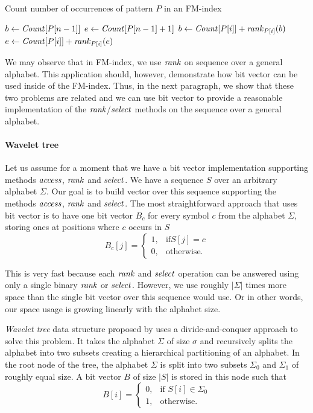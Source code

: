\begin{algorithm}
\caption{Count number of occurrences of pattern $P$ in an FM-index}\label{alg:fm_index_count}
$b \gets \mathit{Count}[P[n-1]]$\;
$e \gets \mathit{Count}[P[n-1]+1]$\;
 {
	$b \gets \mathit{Count}[P[i]] + \mathit{rank}_{P[i]}(b)$\;
	$e \gets \mathit{Count}[P[i]] + \mathit{rank}_{P[i]}(e)$\;
}
\end{algorithm}

We may observe that in FM-index, we use $\mathit{rank}$ on sequence over a general alphabet. This application
should, however, demonstrate how bit vector can be used inside of the FM-index. Thus, in the next
paragraph, we show that these two problems are related and we can use bit vector to provide a
reasonable implementation of the $\mathit{rank}$/$\mathit{select}$ methods on the sequence over a general alphabet.

\paragraph{Wavelet tree}
\label{section:WaweletTree}

Let us assume for a moment that we have a bit vector implementation supporting methods $\mathit{access}$,
$\mathit{rank}$ and $\mathit{select}$. We have a sequence $S$ over an arbitrary alphabet $\Sigma$. Our goal is to
build vector over this sequence supporting the methods $\mathit{access}$, $\mathit{rank}$ and $\mathit{select}$. The most
straightforward approach that uses bit vector is to have one bit vector $B_c$ for every symbol $c$
from the alphabet $\Sigma$, storing ones at positions where $c$ occurs in $S$
\[
    B_c[j]= 
\begin{cases}
	1,& \text{if} S[j]=c \\
    0,& \text{otherwise.}
\end{cases}
\]

This is very fast because each $\mathit{rank}$ and $\mathit{select}$ operation can be answered using only a single
binary $\mathit{rank}$ or $\mathit{select}$. However, we use roughly $|\Sigma|$ times more space than the single bit
vector over this sequence would use. Or in other words, our space usage is growing linearly with the
alphabet size.

\textit{Wavelet tree} data structure proposed by \cite{grossi2003high} uses a divide-and-conquer
approach to solve this problem. It takes the alphabet $\Sigma$ of size $\sigma$ and recursively
splits the alphabet into two subsets creating a hierarchical partitioning of an alphabet. In the
root node of the tree, the alphabet $\Sigma$ is split into two subsets $\Sigma_0$ and $\Sigma_1$
of roughly equal size. A bit vector $B$ of size $|S|$ is stored in this node such that
\[
    B[i]= 
\begin{cases}
    0,& \text{if } S[i]\in \Sigma_0\\
    1,              & \text{otherwise.}
\end{cases}
\]

